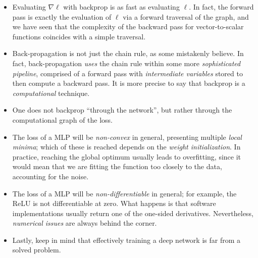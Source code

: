 
\begin{itemize}
    \item Evaluating $\nabla\ell$ with backprop is as fast as evaluating $\ell$. In fact, the forward pass is exactly the evaluation of $\ell$ via a forward traversal of the graph, and we have seen that the complexity of the backward pass for vector-to-scalar functions coincides with  a simple traversal.
    \item Back-propagation is not just the chain rule, as some mistakenly believe. In fact, back-propagation \emph{uses} the chain rule within some more \emph{sophisticated pipeline}, comprised of a forward pass with \emph{intermediate variables} stored to then compute a backward pass. It is more precise to say that backprop is a \emph{computational} technique.
    \item One does not backprop ``through the network'', but rather through the computational graph of the loss.
    \item The loss of a MLP will be \emph{non-convex} in general, presenting multiple \emph{local minima}; which of these is reached depends on the \emph{weight initialization}. In practice, reaching the global optimum usually leads to overfitting, since it would mean that we are fitting the function too closely to the data, accounting for the noise. 
    \item The loss of a MLP will be \emph{non-differentiable} in general; for example, the ReLU is not differentiable at zero. What happens is that software implementations usually return one of the one-sided derivatives. Nevertheless, \emph{numerical issues} are always behind the corner.
    \item Lastly, keep in mind that effectively training a deep network is far from a solved problem.
\end{itemize}

